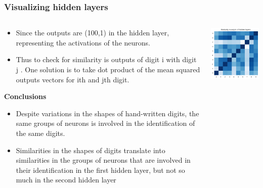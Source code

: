 \documentclass[12pt,t]{beamer}
\begin{document}
\begin{frame}
    \frametitle{Visualizing hidden layers}
    \scriptsize

    \begin{columns}
        \begin{column}[T]{0.5\linewidth}
            \begin{itemize}
                \item Since the outputs are (100,1) in the hidden layer, representing the 
                activations of the neurons. 
                \item Thus to check for similarity is outputs of digit i with digit j . One solution is 
                to take dot product of the mean squared outputs vectors for ith and jth digit.


            \end{itemize}

            \textbf{Conclusions}
            \begin{itemize}
                \item Despite variations in the shapes of hand-written digits,
                 the same groups of neurons is involved in the identification of the same digits.
                 \item Similarities in the shapes of digits translate into similarities in the
                  groups of neurons that are involved in their identification in the first hidden
                   layer, but not so much in the second hidden layer

            \end{itemize}
        \end{column}
        \begin{column}[T]{0.5\linewidth}
            \includegraphics[width=\linewidth]{neuron_outputs/similarity_output.png}
        \end{column}


\end{columns}
\end{frame}
\end{document}
